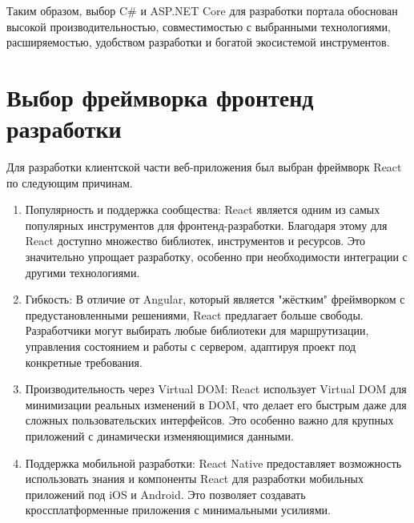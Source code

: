 Таким образом, выбор C\# и ASP.NET Core для разработки портала обоснован высокой производительностью, совместимостью с выбранными технологиями, расширяемостью, удобством разработки и богатой экосистемой инструментов.

\section{Выбор фреймворка фронтенд разработки}

Для разработки клиентской части веб-приложения был выбран фреймворк React~\cite{react} по следующим причинам.

\begin{enumerate}
	\item Популярность и поддержка сообщества: React является одним из самых популярных инструментов для фронтенд-разработки. Благодаря этому для React доступно множество библиотек, инструментов и ресурсов. Это значительно упрощает разработку, особенно при необходимости интеграции с другими технологиями.
	\item Гибкость: В отличие от Angular, который является "жёстким" фреймворком с предустановленными решениями, React предлагает больше свободы. Разработчики могут выбирать любые библиотеки для маршрутизации, управления состоянием и работы с сервером, адаптируя проект под конкретные требования.
	\item Производительность через Virtual DOM: React использует Virtual DOM для минимизации реальных изменений в DOM, что делает его быстрым даже для сложных пользовательских интерфейсов. Это особенно важно для крупных приложений с динамически изменяющимися данными.
	\item Поддержка мобильной разработки: React Native предоставляет возможность использовать знания и компоненты React для разработки мобильных приложений под iOS и Android. Это позволяет создавать кроссплатформенные приложения с минимальными усилиями.
\end{enumerate}